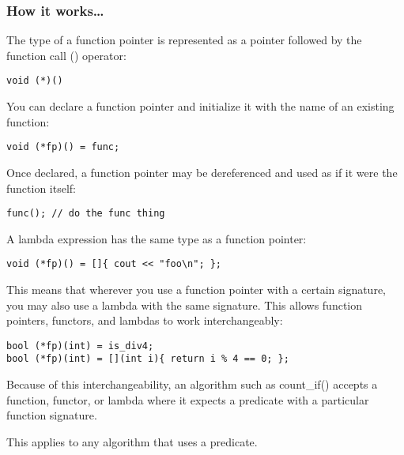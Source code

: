 \subsubsection{How it works…}

The type of a function pointer is represented as a pointer followed by the function call () operator:

\begin{lstlisting}[style=styleCXX]
void (*)()
\end{lstlisting}

You can declare a function pointer and initialize it with the name of an existing function:

\begin{lstlisting}[style=styleCXX]
void (*fp)() = func;
\end{lstlisting}

Once declared, a function pointer may be dereferenced and used as if it were the function itself:

\begin{lstlisting}[style=styleCXX]
func(); // do the func thing
\end{lstlisting}

A lambda expression has the same type as a function pointer:

\begin{lstlisting}[style=styleCXX]
void (*fp)() = []{ cout << "foo\n"; };
\end{lstlisting}

This means that wherever you use a function pointer with a certain signature, you may also use a lambda with the same signature. This allows function pointers, functors, and lambdas to work interchangeably:

\begin{lstlisting}[style=styleCXX]
bool (*fp)(int) = is_div4;
bool (*fp)(int) = [](int i){ return i % 4 == 0; };
\end{lstlisting}

Because of this interchangeability, an algorithm such as count\_if() accepts a function, functor, or lambda where it expects a predicate with a particular function signature.

This applies to any algorithm that uses a predicate.





